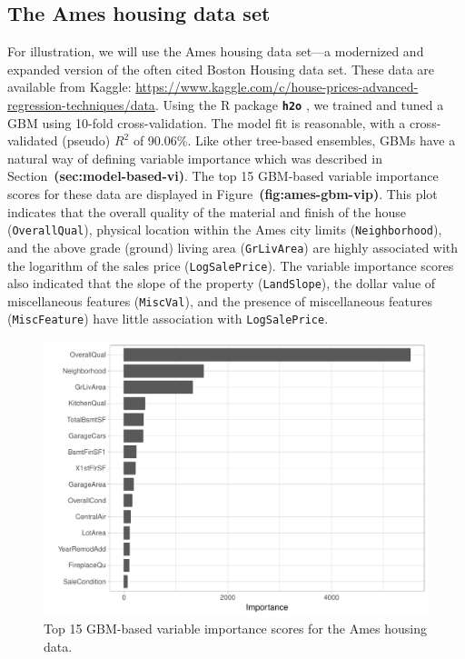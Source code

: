 \documentclass[12pt]{article}
\newcommand{\pkg}[1]{\texorpdfstring%
{{\normalfont\fontseries{b}\selectfont #1}}%
{#1}}
\def\code#1{\texttt{#1}}
\def\pkg#1{\textbf{\texttt{#1}}}
\def\ref#1{\textbf{(#1)}}
\begin{document}
\subsection{The Ames housing data set}
\label{sec:ames}

For illustration, we will use the Ames housing data set---a modernized and expanded version of the often cited Boston Housing data set. These data are available from Kaggle: \url{https://www.kaggle.com/c/house-prices-advanced-regression-techniques/data}. Using the R package \pkg{h2o} \citep{h2o-pkg}, we trained and tuned a GBM using 10-fold cross-validation. The model fit is reasonable, with a cross-validated (pseudo) $R^2$ of 90.06\%. Like other tree-based ensembles, GBMs have a natural way of defining variable importance which was described in Section~\ref{sec:model-based-vi}. The top 15 GBM-based variable importance scores for these data are displayed in Figure~\ref{fig:ames-gbm-vip}. This plot indicates that the overall quality of the material and finish of the house (\code{OverallQual}), physical location within the Ames city limits (\code{Neighborhood}), and the above grade (ground) living area (\code{GrLivArea}) are highly associated with the logarithm of the sales price (\code{LogSalePrice}). The variable importance scores also indicated that the slope of the property (\code{LandSlope}), the dollar value of miscellaneous features (\code{MiscVal}), and the presence of miscellaneous features (\code{MiscFeature})  have little association with \code{LogSalePrice}.

\begin{figure}[!htb]
  \centering
  \includegraphics[width=1.0\textwidth]{ames-gbm-vip}
  \caption{Top 15 GBM-based variable importance scores for the Ames housing data. \label{fig:ames-gbm-vip}}
\end{figure}
\end{document}
